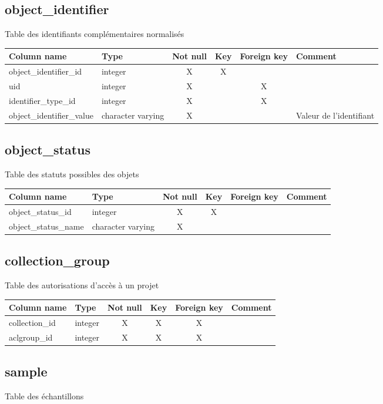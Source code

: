 \subsection{object\_identifier}
Table des identifiants complémentaires normalisés

\begin{tabular}{|l| p{2cm}|c|c|c| p{3cm}|}
\hline
Column name & Type & Not null & Key & Foreign key & Comment \\
\hline
object\_identifier\_id & integer & X & X & & \\
\hline
uid & integer & X & & X & \\
\hline
identifier\_type\_id & integer & X & & X & \\
\hline
object\_identifier\_value & character varying & X & & & Valeur de l'identifiant\\
\hline
\end{tabular}
\subsection{object\_status}
Table des statuts possibles des objets

\begin{tabular}{|l| p{2cm}|c|c|c| p{3cm}|}
\hline
Column name & Type & Not null & Key & Foreign key & Comment \\
\hline
object\_status\_id & integer & X & X & & \\
\hline
object\_status\_name & character varying & X & & & \\
\hline
\end{tabular}
\subsection{collection\_group}
Table des autorisations d'accès à un projet

\begin{tabular}{|l| p{2cm}|c|c|c| p{3cm}|}
\hline
Column name & Type & Not null & Key & Foreign key & Comment \\
\hline
collection\_id & integer & X & X & X & \\
\hline
aclgroup\_id & integer & X & X & X & \\
\hline
\end{tabular}
\subsection{sample}
Table des échantillons

